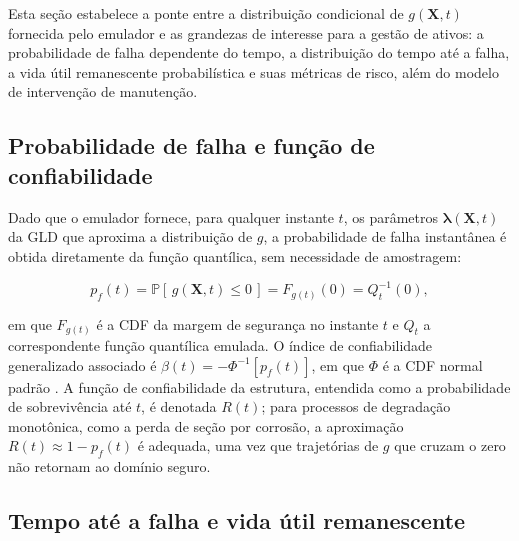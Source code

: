 
Esta seção estabelece a ponte entre a distribuição condicional de $g(\mathbf{X},t)$ fornecida pelo emulador e as grandezas de interesse para a gestão de ativos: a probabilidade de falha dependente do tempo, a distribuição do tempo até a falha, a vida útil remanescente probabilística e suas métricas de risco, além do modelo de intervenção de manutenção.

\subsection{Probabilidade de falha e função de confiabilidade}
\label{subsec:pf}

Dado que o emulador fornece, para qualquer instante $t$, os parâmetros $\hat{\boldsymbol{\lambda}}(\mathbf{X},t)$ da GLD que aproxima a distribuição de $g$, a probabilidade de falha instantânea é obtida diretamente da função quantílica, sem necessidade de amostragem:

\begin{equation}
p_f(t) = \mathbb{P}\left[\, g(\mathbf{X}, t) \leq 0 \,\right] = F_{g(t)}(0) = Q^{-1}_{t}(0),
\label{eq:pf_t}
\end{equation}

\noindent em que $F_{g(t)}$ é a CDF da margem de segurança no instante $t$ e $Q_t$ a correspondente função quantílica emulada. O índice de confiabilidade generalizado associado é $\beta(t) = -\Phi^{-1}\!\left[p_f(t)\right]$, em que $\Phi$ é a CDF normal padrão \citep{melchers2018}. A função de confiabilidade da estrutura, entendida como a probabilidade de sobrevivência até $t$, é denotada $R(t)$; para processos de degradação monotônica, como a perda de seção por corrosão, a aproximação $R(t) \approx 1 - p_f(t)$ é adequada, uma vez que trajetórias de $g$ que cruzam o zero não retornam ao domínio seguro. 

\subsection{Tempo até a falha e vida útil remanescente}
\label{subsec:ttf_rul}

